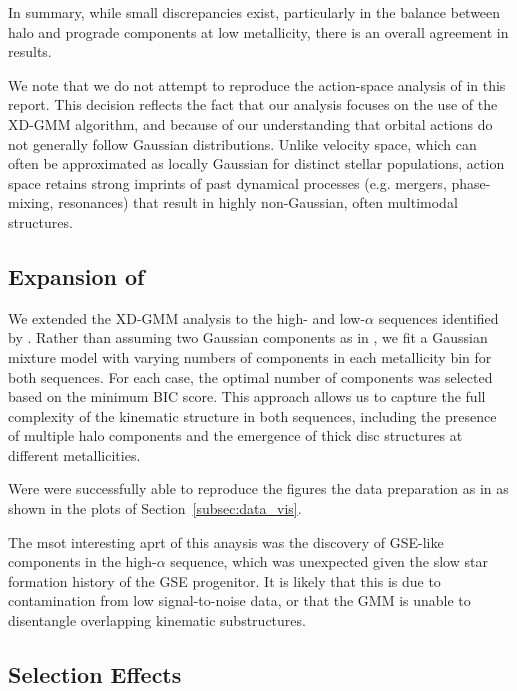 \documentclass[a4paper,12pt]{article}
\begin{document}
In summary, while small discrepancies exist, particularly in the balance between halo and prograde components 
at low metallicity, there is an overall agreement in results.

We note that we do not attempt to reproduce the action-space analysis of \citet{zhang2024existencemetalpoordiscmilky} in this report. 
This decision reflects the fact that our analysis focuses on the use of the XD-GMM algorithm, and because of our
understanding that orbital actions do not generally follow Gaussian distributions. Unlike velocity space, which can often be 
approximated as locally Gaussian for distinct stellar populations, action space retains strong imprints 
of past dynamical processes (e.g. mergers, phase-mixing, resonances) that result in highly non-Gaussian, 
often multimodal structures.



\subsection{Expansion of \citet{Vis2024}}

We extended the XD-GMM analysis to the high- and low-$\alpha$ sequences identified by \citet{Vis2024}. 
Rather than assuming two Gaussian components as in \citet{Vis2024}, we fit a
Gaussian mixture model with varying numbers of components in each metallicity bin for both sequences. 
For each case, the optimal number of components was selected based on the minimum BIC score.
This approach allows us to capture the full complexity of the kinematic structure in both sequences,
including the presence of multiple halo components and the emergence of thick disc structures at different metallicities.

Were were successfully able to reproduce the figures the data preparation as in \citet{Vis2024} as shown in the plots of 
Section~\ref{subsec:data_vis}.

The msot interesting aprt of this anaysis was the discovery of GSE-like components in the high-$\alpha$ sequence,
which was unexpected given the slow star formation history of the GSE progenitor. It is likely that this is due to contamination from 
low signal-to-noise data, or that the GMM is unable to disentangle overlapping kinematic substructures.






\subsection{Selection Effects}
\end{document}
